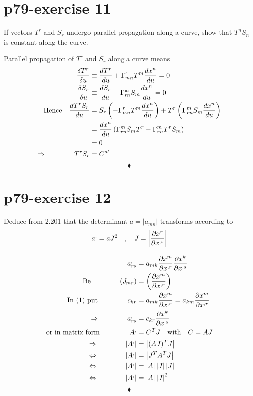 \section{p79-exercise 11}
\begin{tcolorbox}
If vectors $T^r$ and $S_r$ undergo parallel propagation along a curve, show that $T^nS_n$ is constant along the curve.
\end{tcolorbox}
Parallel propagation of $T^r$ and $S_r$  along a curve means
\begin{align}
\frac{\delta T^r}{\delta u} &\equiv \dv{T^r}{u} + \Gamma^r_{mn}T^m \dv{x^n}{u} = 0\\
\frac{\delta S_r}{\delta u} &\equiv \dv{S_r}{u} - \Gamma^m_{rn}S_m \dv{x^n}{u} = 0\\
\text{Hence}\quad \dv{T^rS_r}{u} &= S_r\left(-\Gamma^r_{mn}T^m\dv{x^n}{u}\right) + T^r\left(\Gamma^m_{rn}S_m \dv{x^n}{u} \right)\\
\ &= \dv{x^n}{u}\left(\Gamma^m_{rn}S_mT^r -  \Gamma^m_{rn}T^rS_m\right)\\
\ &=0\\
\Rightarrow \quad\quad\quad\quad T^rS_r &= C^{st}
\end{align} 
$$\blacklozenge$$
\newpage

\section{p79-exercise 12}
\begin{tcolorbox}
Deduce from 2.201 that the determinant $a= \left | a_{mn} \right |$ transforms according to $$a^, = aJ^2 \quad , \quad J = \left | \pdv{x^r}{x^{,s}}\right|$$
\end{tcolorbox}
\begin{align}
\ a^,_{rs} &= a_{mk} \pdv{x^{m}}{x^{,r}} \pdv{x^{k}}{x^{,s}}\\
\text{Be}\quad\quad\quad\quad \left(J_{mr} \right )&= \left (\pdv{x^{m}}{x^{,r}}\right )\\
\text{In (1) put  }\quad\quad\quad\quad c_{kr} &= a_{mk} \pdv{x^{m}}{x^{,r}}= a_{km} \pdv{x^{m}}{x^{,r}} \\
\Rightarrow\quad\quad\quad\quad a^,_{rs} &= c_{kr} \pdv{x^{k}}{x^{,s}}\\
\text{or in matrix form  } \quad\quad\quad\quad A^, &= C^T J\quad \text{with}\quad C = AJ\\
\Rightarrow\quad\quad\quad\quad \left |A^, \right| &= \left | (AJ)^T J\right |\\
\Leftrightarrow\quad\quad\quad\quad \left |A^, \right| &= \left | J^T A^T J\right |\\
\Leftrightarrow\quad\quad\quad\quad \left |A^, \right| &= \left | A\right | \left |J\right |\left |J\right |\\
\Leftrightarrow\quad\quad\quad\quad \left |A^, \right| &= \left | A\right | \left |J\right | ^2
\end{align}
$$\blacklozenge$$
\newpage

